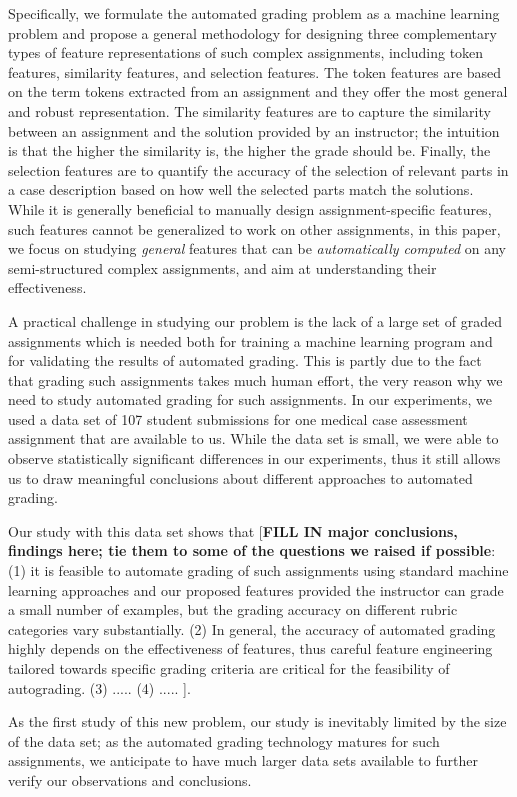 Specifically, we formulate the automated grading problem as a machine learning problem
and propose a general methodology for designing three complementary types of 
feature representations of such complex assignments, including token features, 
similarity features, and selection features. 
The token features are based on the term tokens extracted from an assignment
and they offer the most general and robust representation. The similarity features
are to capture the similarity between an assignment and the solution provided by an instructor;
the intuition is that the higher the similarity is, the higher the grade should be. 
Finally, the selection features are to quantify the accuracy of the selection of relevant
parts in a case description based on how well the selected parts match the solutions. 
While it is generally beneficial to manually design assignment-specific features, such features cannot
 be generalized to work on other assignments, in this paper, we focus on studying
{\em general} features that can be {\em automatically computed} on any semi-structured complex assignments, 
and aim at understanding their effectiveness. 

A practical challenge in studying our problem is the lack of a large set of graded assignments
which is needed both for training a machine learning program and for validating the results of 
automated grading. This is partly due to the fact that grading such assignments takes much human
effort, the very reason why we need to study automated grading for such assignments. In our experiments, 
we used a data set of 107 student submissions for one medical case assessment
assignment that are available to us. While the data set is small, we were able to 
observe statistically significant differences in our experiments, thus it still allows us to 
draw meaningful conclusions about different approaches to automated grading. 

Our study with this data set shows that [{\bf FILL IN major conclusions, findings here; tie them to some of the questions we raised if possible}:
(1) it is feasible to automate grading of such
assignments using standard machine learning approaches and our proposed features provided the instructor can grade a small number of examples, but
the grading accuracy
on different rubric categories vary substantially.  (2) In general, the accuracy of automated grading
highly depends on the effectiveness of features, thus careful feature engineering tailored towards specific grading
criteria are critical for the feasibility of autograding.  (3) ..... (4) ..... ].

As the first study of this new problem, our study is inevitably limited by the size of the data set; as the automated grading technology matures for such assignments, we anticipate to have much larger data sets available to further verify our observations and conclusions. 


